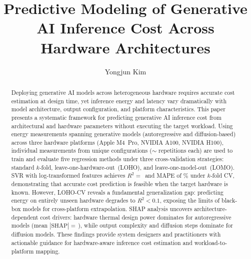 \documentclass[review,12pt,authoryear]{elsarticle}
\begin{document}
\begin{frontmatter}

\title{Predictive Modeling of Generative AI Inference Cost Across Hardware Architectures}

\author[ajou]{Yongjun Kim}

\begin{abstract}
Deploying generative AI models across heterogeneous hardware requires accurate cost estimation at design time, yet inference energy and latency vary dramatically with model architecture, output configuration, and platform characteristics.
This paper presents a systematic framework for predicting generative AI inference cost from architectural and hardware parameters without executing the target workload.
Using \unskip{} energy measurements spanning \unskip{} generative models (autoregressive and diffusion-based) across three hardware platforms (Apple M4~Pro, NVIDIA A100, NVIDIA H100), individual measurements from \unskip{} unique configurations (${\sim}$\unskip{} repetitions each) are used to train and evaluate five regression methods under three cross-validation strategies: standard $k$-fold, leave-one-hardware-out~(LOHO), and leave-one-model-out~(LOMO).
SVR with log-transformed features achieves $R^2 {=}$\,\unskip{} and MAPE of \unskip\% under $k$-fold CV, demonstrating that accurate cost prediction is feasible when the target hardware is known.
However, LOHO-CV reveals a fundamental generalization gap: predicting energy on entirely unseen hardware degrades to $R^2 {<} 0.1$, exposing the limits of black-box models for cross-platform extrapolation.
SHAP analysis uncovers architecture-dependent cost drivers: hardware thermal design power dominates for autoregressive models (mean $|\text{SHAP}| {=}$\,\unskip), while output complexity and diffusion steps dominate for diffusion models.
These findings provide system designers and practitioners with actionable guidance for hardware-aware inference cost estimation and workload-to-platform mapping.
\end{abstract}


\end{frontmatter}
\end{document}
